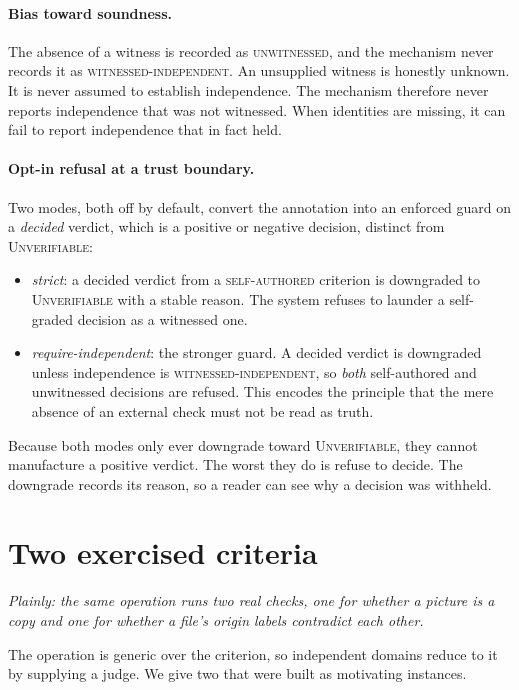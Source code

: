 \documentclass[11pt]{article}
\begin{document}
\paragraph{Bias toward soundness.} The absence of a witness is recorded as \textsc{unwitnessed}, and the mechanism never records it as \textsc{witnessed-independent}. An unsupplied witness is honestly unknown. It is never assumed to establish independence. The mechanism therefore never reports independence that was not witnessed. When identities are missing, it can fail to report independence that in fact held.

\paragraph{Opt-in refusal at a trust boundary.} Two modes, both off by default, convert the annotation into an enforced guard on a \emph{decided} verdict, which is a positive or negative decision, distinct from \textsc{Unverifiable}:
\begin{itemize}[leftmargin=*,itemsep=1pt]
\item \emph{strict}: a decided verdict from a \textsc{self-authored} criterion is downgraded to \textsc{Unverifiable} with a stable reason. The system refuses to launder a self-graded decision as a witnessed one.
\item \emph{require-independent}: the stronger guard. A decided verdict is downgraded unless independence is \textsc{witnessed-independent}, so \emph{both} self-authored and unwitnessed decisions are refused. This encodes the principle that the mere absence of an external check must not be read as truth.
\end{itemize}
Because both modes only ever downgrade toward \textsc{Unverifiable}, they cannot manufacture a positive verdict. The worst they do is refuse to decide. The downgrade records its reason, so a reader can see why a decision was withheld.

\section{Two exercised criteria}\label{sec:crit}
\emph{Plainly: the same operation runs two real checks, one for whether a picture is a copy and one for whether a file's origin labels contradict each other.}

The operation is generic over the criterion, so independent domains reduce to it by supplying a judge. We give two that were built as motivating instances.
\end{document}
